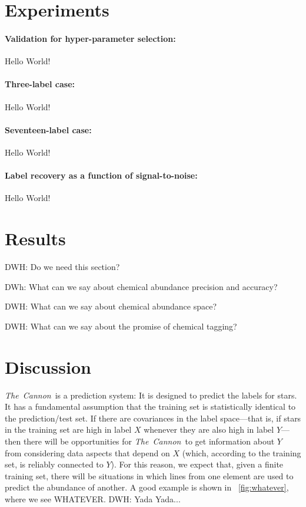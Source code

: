 \documentclass[12pt,preprint]{aastex}
\newcommand{\project}[1]{\textsl{#1}}
\newcommand{\TheCannon}{\project{The~Cannon}}
\begin{document}

\section{Experiments}

\paragraph{Validation for hyper-parameter selection:}
Hello World!

\paragraph{Three-label case:}
Hello World!

\paragraph{Seventeen-label case:}
Hello World!

\paragraph{Label recovery as a function of signal-to-noise:}
Hello World!

\section{Results}

DWH: Do we need this section?

DWh: What can we say about chemical abundance precision and accuracy?

DWH: What can we say about chemical abundance space?

DWH: What can we say about the promise of chemical tagging?

\section{Discussion}


\TheCannon\ is a prediction system: It is designed to predict the
labels for stars.
It has a fundamental assumption that the training set is statistically
identical to the prediction/test set.
If there are covariances in the label space---that is, if stars in the
training set are high in label $X$ whenever they are also high in
label $Y$---then there will be opportunities for \TheCannon\ to get
information about $Y$ from considering data aspects that depend on
$X$ (which, according to the training set, is reliably connected to $Y$).
For this reason, we expect that, given a finite training set, there
will be situations in which lines from one element are used to predict
the abundance of another.
A good example is shown in \figurename~\ref{fig:whatever}, where we
see WHATEVER.
DWH: Yada Yada...
\end{document}
